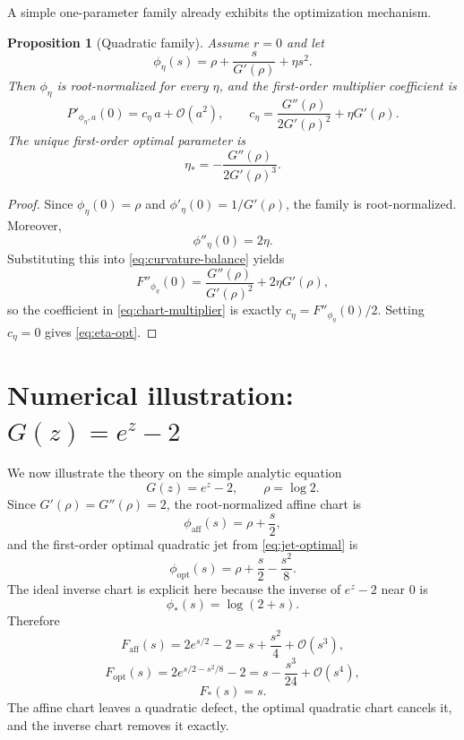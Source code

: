 \documentclass[11pt]{article}
\newtheorem{proposition}[theorem]{Proposition}
\theoremstyle{definition}
\newcommand{\Oterm}{\mathcal{O}}
\begin{document}
A simple one-parameter family already exhibits the optimization mechanism.

\begin{proposition}[Quadratic family]\label{prop:quadratic-family}
Assume $r=0$ and let
\begin{equation}\label{eq:quadfamily}
\phi_{\eta}(s)=\rho+\frac{s}{G'(\rho)}+\eta s^2.
\end{equation}
Then $\phi_{\eta}$ is root-normalized for every $\eta$, and the first-order multiplier coefficient is
\begin{equation}\label{eq:ceta-general}
P'_{\phi_\eta,a}(0)=c_\eta\, a+\Oterm(a^2),
\qquad
c_\eta=\frac{G''(\rho)}{2G'(\rho)^2}+\eta G'(\rho).
\end{equation}
The unique first-order optimal parameter is
\begin{equation}\label{eq:eta-opt}
\eta_*=-\frac{G''(\rho)}{2G'(\rho)^3}.
\end{equation}
\end{proposition}

\begin{proof}
Since $\phi_\eta(0)=\rho$ and $\phi'_\eta(0)=1/G'(\rho)$, the family is root-normalized. Moreover,
\[
\phi''_\eta(0)=2\eta.
\]
Substituting this into \eqref{eq:curvature-balance} yields
\[
F''_{\phi_\eta}(0)=\frac{G''(\rho)}{G'(\rho)^2}+2\eta G'(\rho),
\]
so the coefficient in \eqref{eq:chart-multiplier} is exactly $c_\eta=F''_{\phi_\eta}(0)/2$. Setting $c_\eta=0$ gives \eqref{eq:eta-opt}.
\end{proof}

\section{Numerical illustration: \texorpdfstring{$G(z)=e^z-2$}{G(z)=exp(z)-2}}
We now illustrate the theory on the simple analytic equation
\[
G(z)=e^z-2,
\qquad
\rho=\log 2.
\]
Since $G'(\rho)=G''(\rho)=2$, the root-normalized affine chart is
\[
\phi_{\mathrm{aff}}(s)=\rho+\frac{s}{2},
\]
and the first-order optimal quadratic jet from \eqref{eq:jet-optimal} is
\[
\phi_{\mathrm{opt}}(s)=\rho+\frac{s}{2}-\frac{s^2}{8}.
\]
The ideal inverse chart is explicit here because the inverse of $e^z-2$ near $0$ is
\[
\phi_*(s)=\log(2+s).
\]
Therefore
\[
F_{\mathrm{aff}}(s)=2e^{s/2}-2=s+\frac{s^2}{4}+\Oterm(s^3),
\]
\[
F_{\mathrm{opt}}(s)=2e^{s/2-s^2/8}-2=s-\frac{s^3}{24}+\Oterm(s^4),
\]
\[
F_*(s)=s.
\]
The affine chart leaves a quadratic defect, the optimal quadratic chart cancels it, and the inverse chart removes it exactly.
\end{document}
